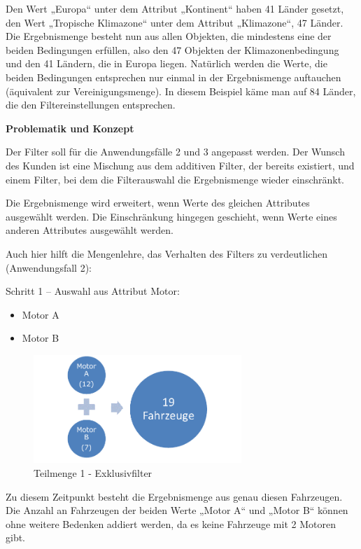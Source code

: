 Den Wert „Europa“ unter dem Attribut „Kontinent“ haben 41 Länder gesetzt, den Wert „Tropische Klimazone“ unter dem Attribut „Klimazone“, 47 Länder. Die Ergebnismenge besteht nun aus allen Objekten, die mindestens eine der beiden Bedingungen erfüllen, also den 47 Objekten der Klimazonenbedingung und den 41 Ländern, die in Europa liegen. Natürlich werden die Werte, die beiden Bedingungen entsprechen nur einmal in der Ergebnismenge auftauchen (äquivalent zur Vereinigungsmenge). In diesem Beispiel käme man auf 84 Länder, die den Filtereinstellungen entsprechen.

\textbf{Problematik und Konzept}

Der Filter soll für die Anwendungsfälle 2 und 3 angepasst werden. Der Wunsch des Kunden ist eine Mischung aus dem additiven Filter, der bereits existiert, und einem Filter, bei dem die Filterauswahl die Ergebnismenge wieder einschränkt.

Die Ergebnismenge wird erweitert, wenn Werte des gleichen Attributes ausgewählt werden. Die Einschränkung hingegen geschieht, wenn Werte eines anderen Attributes ausgewählt werden.

Auch hier hilft die Mengenlehre, das Verhalten des Filters zu verdeutlichen (Anwendungsfall 2):

Schritt 1 – Auswahl aus Attribut Motor:
\begin{itemize}
	\item Motor A
	\item Motor B
\end{itemize}

\begin{figure}[H]
 \centering
 \includegraphics[width=0.7\textwidth]{grafiken/Filter_Motor.png}
 \caption{Teilmenge 1 - Exklusivfilter}
 \label{fig:filter2}
\end{figure}

Zu diesem Zeitpunkt besteht die Ergebnismenge aus genau diesen Fahrzeugen. Die Anzahl an Fahrzeugen der beiden Werte „Motor A“ und „Motor B“ können ohne weitere Bedenken addiert werden, da es keine Fahrzeuge mit 2 Motoren gibt.

